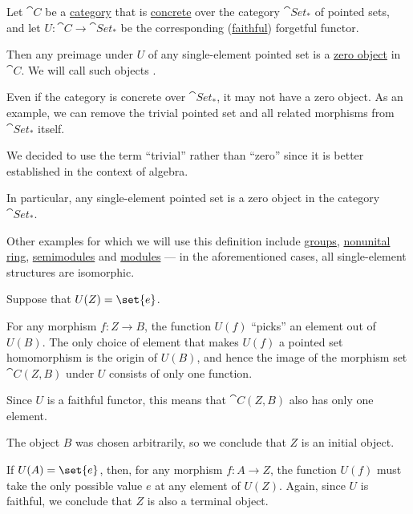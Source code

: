 \begin{definition}\label{def:trivial_object}\mimprovised
  Let \( \cat{C} \) be a \hyperref[def:category]{category} that is \hyperref[def:concrete_category]{concrete} over the category \hyperref[def:pointed_set/category]{\( \cat{Set}_* \)} of pointed sets, and let \( U: \cat{C} \to \cat{Set}_* \) be the corresponding (\hyperref[def:functor_invertibility/faithful]{faithful}) forgetful functor.

  Then any preimage under \( U \) of any single-element pointed set is a \hyperref[def:universal_objects/zero]{zero object} in \( \cat{C} \). We will call such objects .
\end{definition}
\begin{comments}
  \item Even if the category is concrete over \( \cat{Set}_* \), it may not have a zero object. As an example, we can remove the trivial pointed set and all related morphisms from \( \cat{Set}_* \) itself.
  \item We decided to use the term \enquote{trivial} rather than \enquote{zero} since it is better established in the context of algebra.
  \item In particular, any single-element pointed set is a zero object in the category \( \cat{Set}_* \).
  \item Other examples for which we will use this definition include \hyperref[def:group]{groups}, \hyperref[def:ring]{nonunital ring}, \hyperref[def:semimodule]{semimodules} and \hyperref[def:module]{modules} --- in the aforementioned cases, all single-element structures are isomorphic.
\end{comments}
\begin{defproof}
  Suppose that \( U(Z) = \set{ e } \).

   For any morphism \( f: Z \to B \), the function \( U(f) \) \enquote{picks} an element out of \( U(B) \). The only choice of element that makes \( U(f) \) a pointed set homomorphism is the origin of \( U(B) \), and hence the image of the morphism set \( \cat{C}(Z, B) \) under \( U \) consists of only one function.

  Since \( U \) is a faithful functor, this means that \( \cat{C}(Z, B) \) also has only one element.

  The object \( B \) was chosen arbitrarily, so we conclude that \( Z \) is an initial object.

   If \( U(A) = \set{ e } \), then, for any morphism \( f: A \to Z \), the function \( U(f) \) must take the only possible value \( e \) at any element of \( U(Z) \). Again, since \( U \) is faithful, we conclude that \( Z \) is also a terminal object.
\end{defproof}

